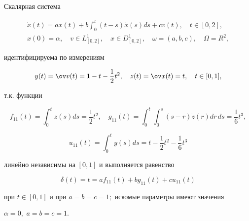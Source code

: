 \begin{exam}


Скалярная система


\begin{gather*}


\Dot{x}(t) = a x(t) + b \int_0^t(t-s)\Dot{x}(s)ds + c v(t),\quad


t\in[0,2],\\


x(0)=\alpha,\quad


v\in L^1_{[0,2]},\quad


x\in D^1_{[0,2]},\quad


\omega=(a, b, c),\quad \Omega= R^2,


\end{gather*}


идентифицируема по измерениям


$$


y(t) = \ov v(t) = 1-t-\frac{1}{2} t^2,\quad z(t) =


\ov x(t) = t,\quad t\in[0,1],


$$


т.к. функции


$$


f_{11}(t) = \int_0^t z(s)ds= \frac{1}{2} t^2,\quad


g_{11}(t) = \int_0^t\int_0^s(s-r)\Dot{z}(r) dr\,ds = \frac{1}{6}t^3,


$$


$$


u_{11}(t) = \int_0^t y(s)ds = t-\frac{1}{2}t^2 - \frac{1}{6}t^3


$$


линейно независимы на $[0,1]$ и выполняется равенство


$$


\delta(t)=t=af_{11}(t)+b g_{11}(t) + c u_{11}(t)


$$


при $t\in[0,1]$ и при $a= b= c= 1;$ искомые параметры имеют значения


$\alpha=0,$ $a= b= c= 1.$


\end{exam}





